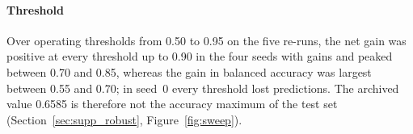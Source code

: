 \paragraph{Threshold}
Over operating thresholds from 0.50 to 0.95 on the five re-runs, the net gain
was positive at every threshold up to 0.90 in the four seeds with gains and
peaked between 0.70 and 0.85, whereas the gain in balanced accuracy was largest
between 0.55 and 0.70; in seed~0 every threshold lost predictions. The archived
value 0.6585 is therefore not the accuracy maximum of the test set
(Section~\ref{sec:supp_robust}, Figure~\ref{fig:sweep}).
